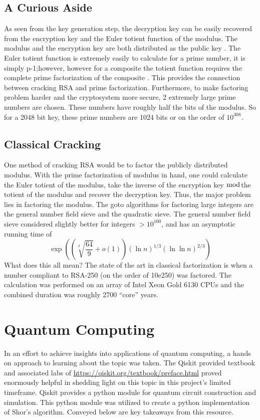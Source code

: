 \documentclass[journal]{IEEEtran}
\begin{document}
\subsection{A Curious Aside}

As seen from the key generation step, the decryption key can be easily recovered
from the encryption key and the Euler totient function of the modulus. The
modulus and the encryption key are both distributed as the public key . The
Euler totient function is extremely easily to calculate for a prime number, it
is simply p-1;however, however for a composite the totient function requires the
complete prime factorization of the composite . This provides the connection
between cracking RSA and prime factorization.   Furthermore, to make factoring
problem harder and the cryptosystem more secure, 2 extremely large prime numbers
are chosen. These numbers have roughly half the bits of the modulus. So for a
2048 bit key, these prime numbers are 1024 bits or on the order of \(10^{308}\).

\subsection{Classical Cracking}

One method of cracking RSA would be to factor the publicly distributed modulus.
With the prime factorization of modulus in hand, one could calculate the Euler
totient of the modulus, take the inverse of the encryption key \(\bmod\)the totient of the
modulus and recover the decryption key. Thus, the major problem lies in
factoring the modulus. The goto algorithms for factoring large integers are the
general number field sieve and the quadratic sieve. The general number field
sieve considered slightly better for integers \(> 10^{100}\), and  has an asymptotic running
time of
\[\exp\left(\left(\sqrt[3]{\frac{64}{9}} +o( 1)\right)(\ln n)^{1/3}(\ln\ln n)^{2/3}\right) \]
What does this all mean? The state of the art \cite{Zimmermann2020} in classical factorization is when
a number compliant to RSA-250 (on the order of 10e250) was factored. The
calculation was performed on an array of Intel Xeon Gold 6130 CPUs and the
combined duration was roughly 2700 ``core'' years.

\section{Quantum Computing}
In an effort to achieve insights into applications of quantum computing, a hands
on approach to learning about the topic was taken. The Qiskit provided textbook and associated
labs of \url{https://qiskit.org/textbook/preface.html}
proved enormously helpful in shedding light on this topic in this project's
limited timeframe. Qiskit provides a python module for quantum circuit
construction and simulation. This python module was utilized to create a python
implementation of Shor's algorithm. Conveyed below are key takeaways from this
resource.
\end{document}
